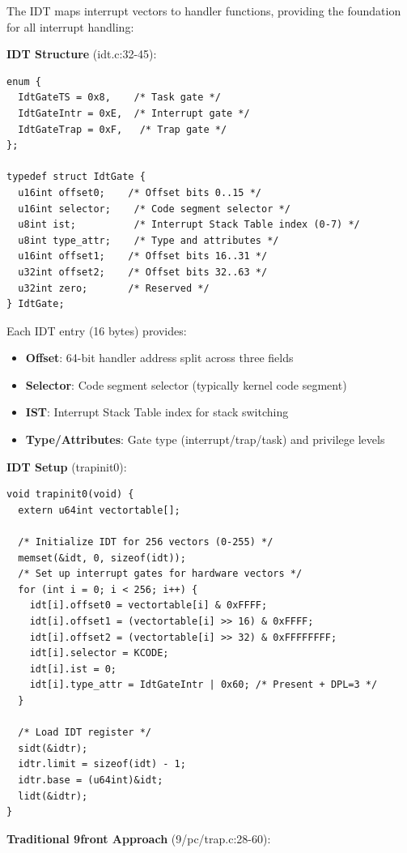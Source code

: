 \documentclass[11pt,letterpaper]{article}
\begin{document}
The IDT maps interrupt vectors to handler functions, providing the foundation for all interrupt handling:

\textbf{IDT Structure} (idt.c:32-45):

\begin{lstlisting}
enum {
  IdtGateTS = 0x8,    /* Task gate */
  IdtGateIntr = 0xE,  /* Interrupt gate */
  IdtGateTrap = 0xF,   /* Trap gate */
};

typedef struct IdtGate {
  u16int offset0;    /* Offset bits 0..15 */
  u16int selector;    /* Code segment selector */
  u8int ist;          /* Interrupt Stack Table index (0-7) */
  u8int type_attr;    /* Type and attributes */
  u16int offset1;    /* Offset bits 16..31 */
  u32int offset2;    /* Offset bits 32..63 */
  u32int zero;       /* Reserved */
} IdtGate;
\end{lstlisting}

Each IDT entry (16 bytes) provides:
\begin{itemize}
\item \textbf{Offset}: 64-bit handler address split across three fields
\item \textbf{Selector}: Code segment selector (typically kernel code segment)
\item \textbf{IST}: Interrupt Stack Table index for stack switching
\item \textbf{Type/Attributes}: Gate type (interrupt/trap/task) and privilege levels
\end{itemize}

\textbf{IDT Setup} (trapinit0):

\begin{lstlisting}
void trapinit0(void) {
  extern u64int vectortable[];
  
  /* Initialize IDT for 256 vectors (0-255) */
  memset(&idt, 0, sizeof(idt));  
  /* Set up interrupt gates for hardware vectors */
  for (int i = 0; i < 256; i++) {
    idt[i].offset0 = vectortable[i] & 0xFFFF;
    idt[i].offset1 = (vectortable[i] >> 16) & 0xFFFF;
    idt[i].offset2 = (vectortable[i] >> 32) & 0xFFFFFFFF;
    idt[i].selector = KCODE;
    idt[i].ist = 0;
    idt[i].type_attr = IdtGateIntr | 0x60; /* Present + DPL=3 */
  }
  
  /* Load IDT register */
  sidt(&idtr);
  idtr.limit = sizeof(idt) - 1;
  idtr.base = (u64int)&idt;
  lidt(&idtr);
}
\end{lstlisting}

\textbf{Traditional 9front Approach} (9/pc/trap.c:28-60):
\end{document}
